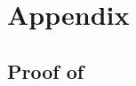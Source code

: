 \documentclass[a4paper,10pt]{article}
\theoremstyle{definition} %
\theoremstyle{definition} %
\theoremstyle{definition} %
\newtheorem{theorem}[definition]{Theorem}
\theoremstyle{definition} %
\newcommand{\0}{\boldsymbol{0}}
\begin{document}
\section{Appendix}

\subsection{Proof of  \label{sec:proof_focker}}





\end{document}
